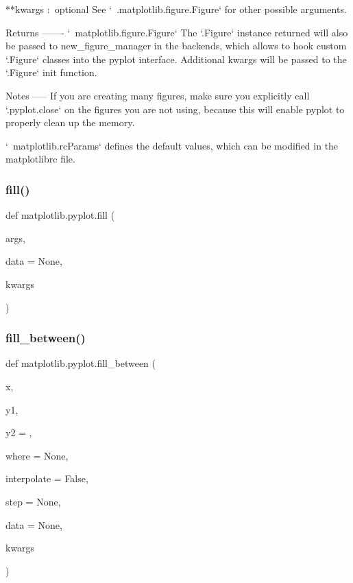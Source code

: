 \begin{DoxyVerb}
**kwargs : optional
    See `~.matplotlib.figure.Figure` for other possible arguments.

Returns
-------
`~matplotlib.figure.Figure`
    The `.Figure` instance returned will also be passed to
    new_figure_manager in the backends, which allows to hook custom
    `.Figure` classes into the pyplot interface. Additional kwargs will be
    passed to the `.Figure` init function.

Notes
-----
If you are creating many figures, make sure you explicitly call
`.pyplot.close` on the figures you are not using, because this will
enable pyplot to properly clean up the memory.

`~matplotlib.rcParams` defines the default values, which can be modified
in the matplotlibrc file.
\end{DoxyVerb}
 \mbox{\label{namespacematplotlib_1_1pyplot_a75e31f548b55de2ff4b4fb303d16fbc6}} 
\subsubsection{\texorpdfstring{fill()}{fill()}}
{\footnotesize\ttfamily def matplotlib.\+pyplot.\+fill (\begin{DoxyParamCaption}\item[{}]{args,  }\item[{}]{data = {\ttfamily None},  }\item[{}]{kwargs }\end{DoxyParamCaption})}

\mbox{\label{namespacematplotlib_1_1pyplot_a71d76ed8e5931ba2ba1d82611a18758f}} 
\subsubsection{\texorpdfstring{fill\+\_\+between()}{fill\_between()}}
{\footnotesize\ttfamily def matplotlib.\+pyplot.\+fill\+\_\+between (\begin{DoxyParamCaption}\item[{}]{x,  }\item[{}]{y1,  }\item[{}]{y2 = {},  }\item[{}]{where = {\ttfamily None},  }\item[{}]{interpolate = {\ttfamily False},  }\item[{}]{step = {\ttfamily None},  }\item[{}]{data = {\ttfamily None},  }\item[{}]{kwargs }\end{DoxyParamCaption})}

